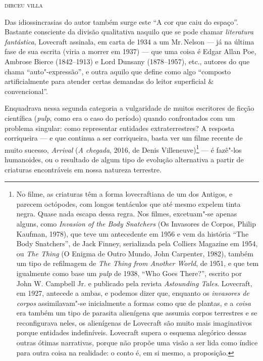 
\begin{flushright}
\textsc{dirceu villa}
\end{flushright}

\noindent{}Das idiossincrasias do autor também surge este ``A cor que caiu do espaço''.
Bastante consciente da divisão qualitativa naquilo que
se pode chamar \emph{literatura fantástica}, Lovecraft assinala, em carta de 1934 a um Mr.\,Nelson --- já na última fase de sua escrita (viria
a morrer em 1937) --- que uma coisa é Edgar Allan Poe, Ambrose
Bierce (1842--1913) e Lord Dunsany (1878--1957), etc., autores do que
chama ``auto"-expressão'', e outra aquilo que define como algo ``composto
artificialmente para atender certas demandas do leitor superficial \&
convencional''.

Enquadrava nessa segunda categoria a vulgaridade de muitos escritores de ficção
científica (\emph{pulp}, como era o caso do período) quando confrontados
com um problema singular: como representar entidades extraterrestres? A
resposta corriqueira --- e que continua a ser corriqueira, basta ver um
filme recente de muito sucesso, \emph{Arrival} (\emph{A chegada}, 2016,
de Denis Villeneuve)\footnote{No filme, as criaturas têm a forma
  lovecraftiana de um dos Antigos, e parecem octópodes, com longos
  tentáculos que até mesmo expelem tinta negra. Quase nada escapa dessa
  regra. Nos filmes, excetuam"-se apenas alguns, como \emph{Invasion of
  the Body Snatchers} (Os Invasores de Corpos, Philip Kaufman, 1978),
  que teve um antecedente em 1956 e vem da história ``The Body
  Snatchers'', de Jack Finney, serializada pela Colliers Magazine em
  1954, ou \emph{The Thing} (O Enigma de Outro Mundo, John Carpenter,
  1982), também um tipo de refilmagem de \emph{The Thing from Another
  World}, de 1951, e que tem igualmente como base um \emph{pulp} de
  1938, ``Who Goes There?'', escrito por John W. Campbell Jr. e
  publicado pela revista \emph{Astounding Tales}. Lovecraft, em 1927,
  antecede a ambas, e podemos dizer que, enquanto os \emph{invasores de
  corpos} assimilavam"-se inicialmente a formas como que de plantas, e a
  \emph{coisa} era também um tipo de parasita alienígena que assumia
  corpos terrestres e se reconfigurava neles, os alienígenas de
  Lovecraft são muito mais imaginativos porque entidades indefiníveis.
  Lovecraft supera o esquema alegórico dessas outras ótimas narrativas,
  porque não propõe uma visão a ser lida como índice para outra coisa na
  realidade: o conto é, em si mesmo, a proposição.} --- é fazê"-los
humanoides, ou o resultado de algum tipo de evolução alternativa a
partir de criaturas encontráveis em nossa natureza terrestre.

